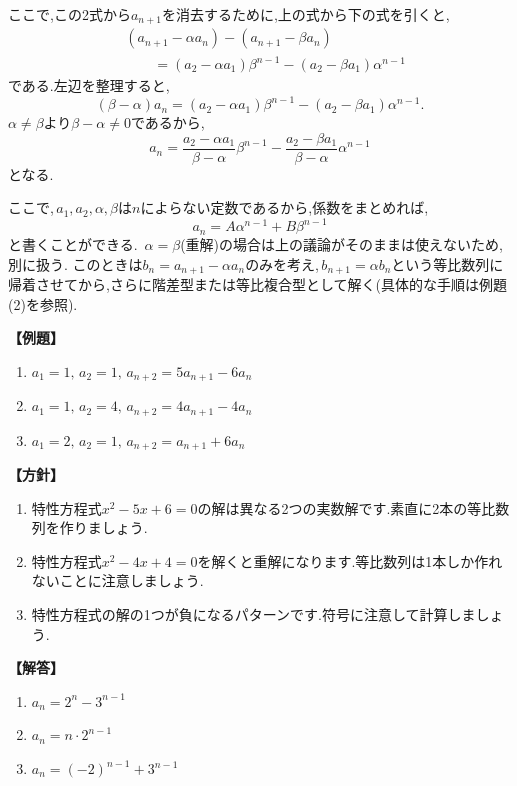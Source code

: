    ここで,この2式から$a_{n+1}$を消去するために,上の式から下の式を引くと,
    \begin{align*}
      &(a_{n+1}-\alpha a_n)-(a_{n+1}-\beta a_n)\\
      &\qquad=(a_2-\alpha a_1)\beta^{n-1}
      -(a_2-\beta a_1)\alpha^{n-1}
    \end{align*}
    である.左辺を整理すると,
    \[
      (\beta-\alpha)a_n
      =(a_2-\alpha a_1)\beta^{n-1}
      -(a_2-\beta a_1)\alpha^{n-1}.
    \]
    $\alpha\ne\beta$より$\beta-\alpha\ne0$であるから,
    \[
      a_n
      =\frac{a_2-\alpha a_1}{\beta-\alpha}\beta^{n-1}
      -\frac{a_2-\beta a_1}{\beta-\alpha}\alpha^{n-1}
    \]
    となる.

    ここで,\,$a_1,a_2,\alpha,\beta$は$n$によらない定数であるから,係数をまとめれば,
    \[
      a_n=A\alpha^{n-1}+B\beta^{n-1}
    \]
    と書くことができる.
    \,$\alpha=\beta$(重解)の場合は上の議論がそのままは使えないため,別に扱う.
    このときは$b_n=a_{n+1}-\alpha a_n$のみを考え,\,$b_{n+1}=\alpha b_n$という等比数列に帰着させてから,さらに階差型または等比複合型として解く(具体的な手順は例題(2)を参照).

    \noindent \textbf{【例題】}
    \begin{enumerate}[label=(\arabic*),parsep=3pt]
      \item $\displaystyle a_1=1,\,a_2=1,\, a_{n+2}=5a_{n+1}-6a_n$
      \item $\displaystyle a_1=1,\,a_2=4,\, a_{n+2}=4a_{n+1}-4a_n$
      \item $\displaystyle a_1=2,\,a_2=1,\, a_{n+2}=a_{n+1}+6a_n$
    \end{enumerate}

    \noindent\textbf{【方針】}
    \begin{enumerate}[label=(\arabic*),parsep=3pt]
      \item 特性方程式$x^2-5x+6=0$の解は異なる2つの実数解です.素直に2本の等比数列を作りましょう.
      \item 特性方程式$x^2-4x+4=0$を解くと重解になります.等比数列は1本しか作れないことに注意しましょう.
      \item 特性方程式の解の1つが負になるパターンです.符号に注意して計算しましょう.
    \end{enumerate}

    \noindent\textbf{【解答】}
    \begin{enumerate}[label=(\arabic*),parsep=3pt]
      \item $\displaystyle a_n=2^n-3^{n-1}$
      \item $\displaystyle a_n=n\cdot2^{n-1}$
      \item $\displaystyle a_n=(-2)^{n-1}+3^{n-1}$
    \end{enumerate}

